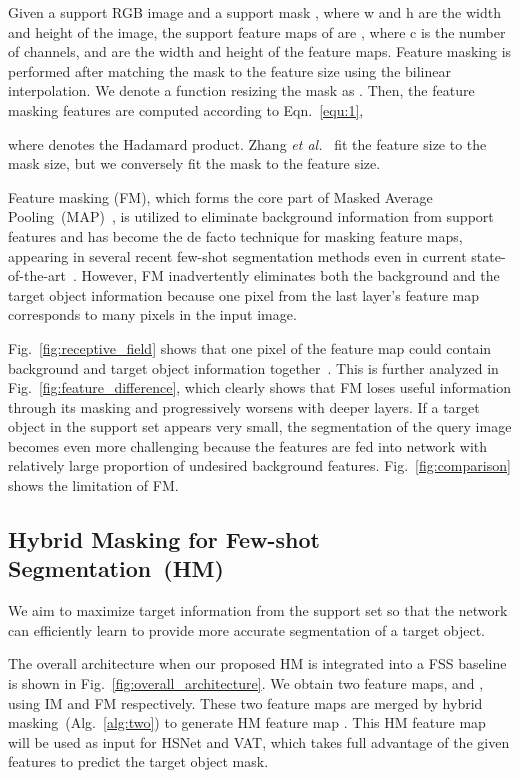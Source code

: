 \documentclass[runningheads]{llncs}
\begin{document}
Given a support RGB image  and a support mask , where w and h are the width and height of the image, the support feature maps of  are  , where c is the number of channels,  and  are the width and height of the feature maps. Feature masking is performed after matching the mask to the feature size using the bilinear interpolation. We denote a function resizing the mask as   . Then, the feature masking features  are computed according to Eqn.~\ref{equ:1},

where  denotes the Hadamard product. Zhang \textit{et al.}~\cite{Zhang2020SGOneSG} fit the feature size to the mask size, but we conversely fit the mask to the feature size.

Feature masking (FM), which forms the core part of Masked Average Pooling~(MAP)~\cite{Zhang2020SGOneSG}, is utilized to eliminate background information from support features and has become the de facto technique for masking feature maps, appearing in several recent few-shot segmentation methods \cite{Zhang2020SGOneSG,CANet,PFENet,PANet,yang2021mining} even in current state-of-the-art~\cite{HSNet}.
However, FM inadvertently eliminates both the background and the target object information because one pixel from the last layer's feature map corresponds to many pixels in the input image.

Fig.~\ref{fig:receptive_field} shows that one pixel of the feature map could contain background and target object information together~\cite{receptive_analysis}. This is further analyzed in Fig.~\ref{fig:feature_difference}, which clearly shows that FM loses useful information through its masking and progressively worsens with deeper layers.
If a target object in the support set appears very small, the segmentation of the query image becomes even more challenging because the features are fed into network with relatively large proportion of undesired background features. Fig.~\ref{fig:comparison} shows the limitation of FM. 


\subsection{Hybrid Masking for Few-shot Segmentation~(HM)}
\label{subsection:hmfs}

We aim to maximize target information from the support set so that the network can efficiently learn to provide more accurate segmentation of a target object.


The overall architecture when our proposed HM is integrated into a FSS baseline is shown in Fig.~\ref{fig:overall_architecture}. We obtain two feature maps,  and , using IM and FM respectively. These two feature maps are merged by hybrid masking~(Alg.~\ref{alg:two}) to generate HM feature map . This HM feature map will be used as input for HSNet and VAT, which takes full advantage of the given features to predict the target object mask.
\end{document}
